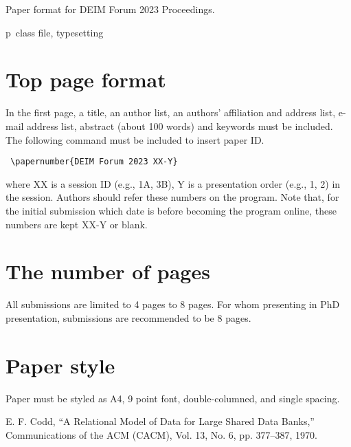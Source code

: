 \documentclass{deime}
\begin{document}
\pagestyle{empty}
\begin{eabstract}
Paper format for DEIM Forum 2023 Proceedings.
\end{eabstract}
\begin{ekeyword}
p\LaTeXe\ class file, typesetting
\end{ekeyword}
\maketitle

\section{Top page format}

In the first page, a title, an author list, an authors' affiliation and address list,
e-mail address list, abstract (about 100 words) and keywords must be included.
The following command must be included to insert paper ID.
\begin{verbatim}
 \papernumber{DEIM Forum 2023 XX-Y}
\end{verbatim}
where XX is a session ID (e.g., 1A, 3B), Y is a presentation order (e.g., 1, 2)
in the session.
Authors should refer these numbers on the program. 
Note that, for the initial submission which date is before becoming the program online,
these numbers are kept XX-Y or blank.  

\section{The number of pages}

All submissions are limited to 4 pages to 8 pages.
For whom presenting in PhD presentation, submissions are recommended to be 8 pages.

\section{Paper style}

Paper must be styled as A4, 9 point font, double-columned, and single spacing.

\vspace{2em}

\begin{thebibliography}{99}
  E. F. Codd, 
  ``A Relational Model of Data for Large Shared Data Banks,''
  Communications of the {ACM} (CACM), Vol. 13, No. 6, pp. 377--387, 1970.
\end{thebibliography}
\end{document}
